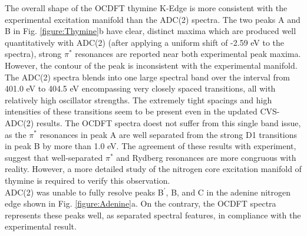 \documentclass[8.5pt,twoside,twocolumn]{article}
\begin{document}
The overall shape of the OCDFT thymine K-Edge is more consistent with the experimental excitation manifold than the ADC(2) spectra. The two peaks A and B in Fig. \ref{figure:Thymine}b have clear, distinct maxima which are produced well quantitatively with ADC(2) (after applying a uniform shift of -2.59 eV to the spectra), strong $\pi^*$ resonances are reported near both experimental peak maxima. However, the contour of the peak is inconsistent with the experimental manifold. The ADC(2) spectra blends into one large spectral band over the interval from 401.0 eV to 404.5 eV encompassing very closely spaced transitions, all with relatively high oscillator strengths. The extremely tight spacings and high intensities of these transitions seem to be present even in the updated CVS-ADC(2) results. The OCDFT spectra doest not suffer from this single band issue, as the $\pi^*$ resonances in peak A are well separated from the strong D1 transitions in peak B by more than 1.0 eV. The agreement of these results with experiment, suggest that well-separated $\pi^*$ and Rydberg resonances are more congruous with reality. However, a more detailed study of the nitrogen core excitation manifold of thymine is required to verify this observation. \\
ADC(2) was unable to fully resolve peaks B$^{\prime}$, B, and C in the adenine nitrogen edge shown in Fig. \ref{figure:Adenine}a. On the contrary, the OCDFT spectra represents these peaks well, as separated spectral features, in compliance with the experimental result. 

\end{document}
